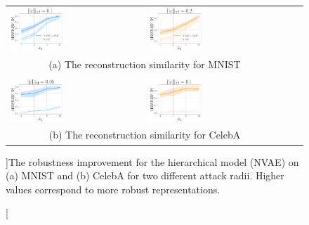 {%
\begin{figure}[t]
    \begin{adjustbox}{center}
    \begin{tabular}{llll}
        \includegraphics[width=0.4\textwidth]{pics/3_adv_att/nvae_mnist_eps_1.pdf} & 
        \includegraphics[width=0.4\textwidth]{pics/3_adv_att/nvae_mnist_eps_2.pdf} \\
        \multicolumn{2}{c}{\small (a) The reconstruction similarity for MNIST} \\ \\
        \includegraphics[width=0.4\textwidth]{pics/3_adv_att/nvae_celeba_eps_1.pdf} & 
        \includegraphics[width=0.4\textwidth]{pics/3_adv_att/nvae_celeba_eps_2.pdf}\\
         \multicolumn{2}{c}{\small (b) The reconstruction similarity for CelebA}\\
    \end{tabular}
    \end{adjustbox}
    \caption[][\baselineskip]{The robustness improvement for the hierarchical model (NVAE) on (a) MNIST and (b) CelebA for two different attack radii. Higher values correspond to more robust representations.}
    \label{fig:nvae_res}
\end{figure}

}
